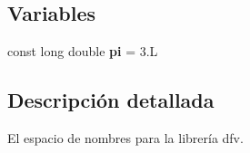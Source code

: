 \subsection*{\-Variables}
\begin{DoxyCompactItemize}
\item 
\hypertarget{namespacedfv_a71bc1ec662e3704a119726649b0b0f91}{const long double {\bfseries pi} = 3.\-L}\label{namespacedfv_a71bc1ec662e3704a119726649b0b0f91}

\end{DoxyCompactItemize}


\subsection{\-Descripción detallada}
\-El espacio de nombres para la librería dfv. 